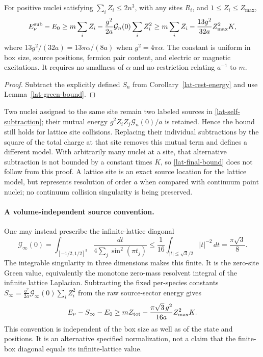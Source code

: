 \begin{corollary}
\label{lat-linear-stability}
For positive nuclei satisfying $\sum_i Z_i\le2n^3$, with any sites
$R_i$, and $1\le Z_i\le Z_{\max}$,
\begin{equation}
 E_\nu^{\rm sub}-E_0
 \ge m\sum_i Z_i-\frac{g^2}{2a}\mathcal G_n(0)\sum_iZ_i^2
 \ge m\sum_i Z_i-\frac{13g^2}{32a}Z_{\max}^2K,
 \label{lat-final-bound}
\end{equation}
where $13g^2/(32a)=13\pi\alpha/(8a)$ when $g^2=4\pi\alpha$.
The constant is uniform in box size, source positions, fermion pair
content, and electric or magnetic excitations.  It requires no
smallness of $\alpha$ and no restriction relating $a^{-1}$ to $m$.
\end{corollary}
\begin{proof}
Subtract the explicitly defined $S_n$ from
Corollary~\ref{lat-rest-energy} and use Lemma~\ref{lat-green-bound}.
\end{proof}

Two nuclei assigned to the same site remain two labeled sources in
\eqref{lat-self-subtraction}; their mutual energy
$g^2Z_iZ_j\mathcal G_n(0)/a$ is retained.  Hence the bound still
holds for lattice site collisions.  Replacing their individual
subtractions by the square of the total charge at that site removes
this mutual term and defines a different model.  With arbitrarily many
nuclei at a site, that alternative subtraction is not bounded by a
constant times $K$, so \eqref{lat-final-bound} does not follow from this
proof.  A lattice site is an exact source location for the lattice model,
but represents resolution of order $a$ when compared with continuum
point nuclei; no continuum collision singularity is being preserved.

\paragraph{A volume-independent source convention.}
One may instead prescribe the infinite-lattice diagonal
\[
\mathcal G_\infty(0)=
\int_{[-1/2,1/2]^3}
\frac{dt}{4\sum_j\sin^2(\pi t_j)}
\le\frac1{16}\int_{|t|\le\sqrt3/2}|t|^{-2}\,dt
=\frac{\pi\sqrt3}{8}.
\]
The integrable singularity in three dimensions makes this finite.
It is the zero-site Green value, equivalently the monotone
zero-mass resolvent integral of the infinite lattice Laplacian.
Subtracting the fixed per-species constants
\(S_\infty=\frac{g^2}{2a}\mathcal G_\infty(0)\sum_iZ_i^2\)
from the raw source-sector energy gives
\[
E_\nu-S_\infty-E_0
\ge mZ_{\rm tot}-\frac{\pi\sqrt3\,g^2}{16a}Z_{\max}^2K.
\]
This convention is independent of the box size as well as of the
state and positions. It is an alternative specified normalization,
not a claim that the finite-box diagonal equals its infinite-lattice value.

